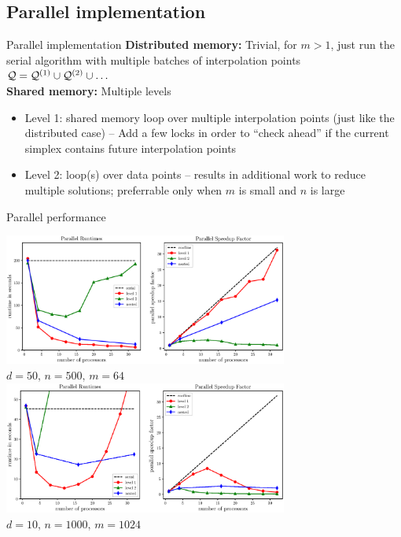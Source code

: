 \documentclass[xcolor=dvipsnames]{beamer}
\begin{document}
\subsection{Parallel implementation}
\begin{frame}{Parallel implementation}
\textbf{Distributed memory:} Trivial, for $m > 1$, just run
the serial algorithm with multiple batches of interpolation points
${\cal Q} = {\cal Q}^{(1)} \cup {\cal Q}^{(2)} \cup \ldots$\\
\medskip
{\bf Shared memory:} Multiple levels
\begin{itemize}
\item Level 1: shared memory loop over multiple interpolation points (just
like the distributed case)
-- Add a few locks in order to ``check ahead'' if the current simplex
contains future interpolation points
\item Level 2: loop(s) over data points -- results in additional work to
reduce multiple solutions; preferrable only when $m$ is small and $n$ is large
\end{itemize}
\end{frame}
\begin{frame}{Parallel performance}
\begin{center}
\includegraphics[width=0.7\textwidth]{parallelBigD.eps}\\
$d=50\text{, }n=500\text{, }m=64$
\includegraphics[width=0.7\textwidth]{parallelBigM.eps}\\
$d=10\text{, }n=1000\text{, }m=1024$
\end{center}
\end{frame}
\end{document}
